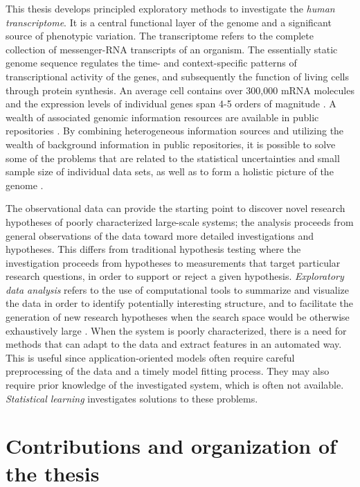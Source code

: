 This thesis develops principled exploratory methods to investigate the
{\it human transcriptome}. It is a central functional layer of the
genome and a significant source of phenotypic variation.  The
transcriptome refers to the complete collection of messenger-RNA
transcripts of an organism. The essentially static genome sequence
regulates the time- and context-specific patterns of transcriptional
activity of the genes, and subsequently the function of living cells
through protein synthesis. An average cell contains over 300,000 mRNA
molecules and the expression levels of individual genes span 4-5
orders of magnitude \citep{Carninci2009}.  A wealth of associated
genomic information resources are available in public repositories
\citep{Cochrane2010}. By combining heterogeneous information sources
and utilizing the wealth of background information in public
repositories, it is possible to solve some of the problems that are
related to the statistical uncertainties and small sample size of
individual data sets, as well as to form a holistic picture of the
genome \citep{Huttenhower2010}.

The observational data can provide the starting point to discover
novel research hypotheses of poorly characterized large-scale systems;
the analysis proceeds from general observations of the data toward
more detailed investigations and hypotheses.  This differs from
traditional hypothesis testing where the investigation proceeds from
hypotheses to measurements that target particular research questions,
in order to support or reject a given hypothesis. \emph{Exploratory
  data analysis} refers to the use of computational tools to summarize
and visualize the data in order to identify potentially interesting
structure, and to facilitate the generation of new research hypotheses
when the search space would be otherwise exhaustively large
\citep{Tukey77}.  When the system is poorly characterized, there is a
need for methods that can adapt to the data and extract features in an
automated way. This is useful since application-oriented models often
require careful preprocessing of the data and a timely model fitting
process. They may also require prior knowledge of the investigated
system, which is often not available. \emph{Statistical learning}
investigates solutions to these problems.

\section{Contributions and organization of the thesis}

